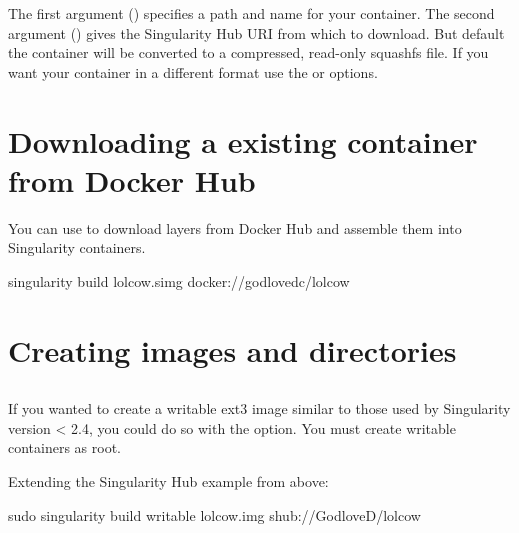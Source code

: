 \documentclass[letterpaper,10pt,english]{sphinxmanual}
\begin{document}
The first argument () specifies a path and name for your container.
The second argument () gives the Singularity Hub URI from which to download.
But default the container will be converted to a compressed, read-only
squashfs file. If you want your container in a different format use
the  or  options.


\section{Downloading a existing container from Docker Hub}
\label{\detokenize{build_a_container:downloading-a-existing-container-from-docker-hub}}
You can use  to download layers from Docker Hub and assemble them into
Singularity containers.

%
\begin{sphinxVerbatim}[commandchars=\\\{\}]
\PYGZdl{} singularity build lolcow.simg docker://godlovedc/lolcow
\end{sphinxVerbatim}


\section{Creating  images and  directories}
\label{\detokenize{build_a_container:creating-writable-images-and-sandbox-directories}}

\subsection{}
\label{\detokenize{build_a_container:writable}}
If you wanted to create a writable ext3 image similar to those used by
Singularity version \textless{} 2.4, you could do so with the  option. You must
create writable containers as root.

Extending the Singularity Hub example from above:

%
\begin{sphinxVerbatim}[commandchars=\\\{\}]
\PYGZdl{} sudo singularity build \PYGZhy{}\PYGZhy{}writable lolcow.img shub://GodloveD/lolcow
\end{sphinxVerbatim}
\end{document}
